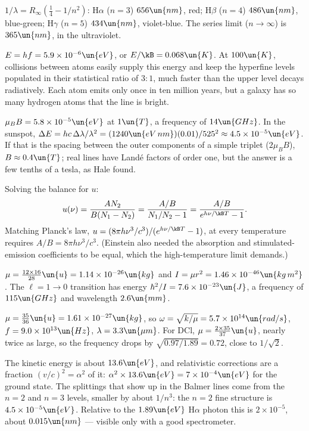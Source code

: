 
 $1/\lambda = R_\infty(\tfrac14 - 1/n^2)$: H$\alpha$ ($n=3$) $656\un{nm}$, red; H$\beta$ ($n = 4$) $486\un{nm}$, blue-green; H$\gamma$ ($n=5$) $434\un{nm}$, violet-blue. The series limit ($n\to\infty$) is $365\un{nm}$, in the ultraviolet.

 $E = hf = 5.9\times10^{-6}\un{eV}$, or $E/\kB = 0.068\un{K}$. At $100\un{K}$, collisions between atoms easily supply this energy and keep the hyperfine levels populated in their statistical ratio of $3:1$, much faster than the upper level decays radiatively. Each atom emits only once in ten million years, but a galaxy has so many hydrogen atoms that the line is bright.

 $\mu_BB = 5.8\times10^{-5}\un{eV}$ at $1\un{T}$, a frequency of $14\un{GHz}$. In the sunspot, $\Delta E = hc\,\Delta\lambda/\lambda^2 = (1240\un{eV\,nm})(0.01)/525^2\approx4.5\times10^{-5}\un{eV}$. If that is the spacing between the outer components of a simple triplet ($2\mu_BB$), $B\approx0.4\un{T}$; real lines have Land\'e factors of order one, but the answer is a few tenths of a tesla, as Hale found.

 Solving the balance for $u$:
\[
  u(\nu) = \frac{AN_2}{B(N_1-N_2)} = \frac{A/B}{N_1/N_2 - 1} = \frac{A/B}{e^{h\nu/\kB T}-1}.
\]
Matching Planck's law, $u = (8\pi h\nu^3/c^3)/(e^{h\nu/\kB T}-1)$, at every temperature requires $A/B = 8\pi h\nu^3/c^3$. (Einstein also needed the absorption and stimulated-emission coefficients to be equal, which the high-temperature limit demands.)

 $\mu = \tfrac{12\times16}{28}\un{u} = 1.14\times10^{-26}\un{kg}$ and $I = \mu r^2 = 1.46\times10^{-46}\un{kg\,m^2}$. The $\ell=1\to0$ transition has energy $\hbar^2/I = 7.6\times10^{-23}\un{J}$, a frequency of $115\un{GHz}$ and wavelength $2.6\un{mm}$.

 $\mu = \tfrac{35}{36}\un{u} = 1.61\times10^{-27}\un{kg}$, so $\omega = \sqrt{k/\mu} = 5.7\times10^{14}\un{rad/s}$, $f = 9.0\times10^{13}\un{Hz}$, $\lambda = 3.3\un{\mu m}$. For DCl, $\mu = \tfrac{2\times35}{37}\un{u}$, nearly twice as large, so the frequency drops by $\sqrt{0.97/1.89} = 0.72$, close to $1/\sqrt2$.

 The kinetic energy is about $13.6\un{eV}$, and relativistic corrections are a fraction $(v/c)^2 = \alpha^2$ of it: $\alpha^2\times13.6\un{eV} = 7\times10^{-4}\un{eV}$ for the ground state. The splittings that show up in the Balmer lines come from the $n=2$ and $n = 3$ levels, smaller by about $1/n^3$: the $n=2$ fine structure is $4.5\times10^{-5}\un{eV}$. Relative to the $1.89\un{eV}$ H$\alpha$ photon this is $2\times10^{-5}$, about $0.015\un{nm}$ --- visible only with a good spectrometer.

